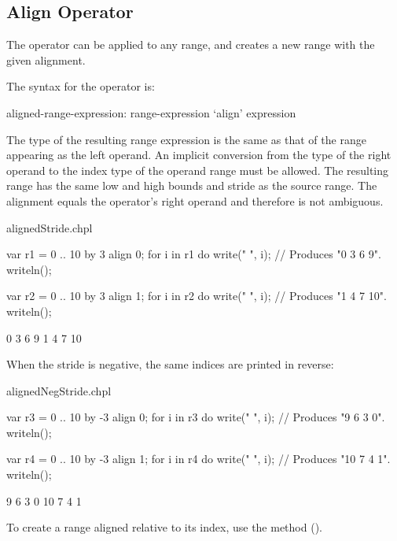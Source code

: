 \subsection{Align Operator}
\label{Align_Operator}

The  operator can be applied to any range, and creates a new range
with the given alignment.  

The syntax for the  operator is:
\begin{syntax}
aligned-range-expression:
  range-expression `align' expression
\end{syntax}
\noindent The type of the resulting range expression is the same as that of the
range appearing as the left operand.  An implicit conversion from
the type of the right operand to the index type of the operand range
must be allowed.
The resulting range has the
same low and high bounds and stride as the source range. The
alignment equals the  operator's right operand
and therefore is not ambiguous. 

\begin{chapelexample}{alignedStride.chpl}
\begin{chapel}
var r1 = 0 .. 10 by 3 align 0;
for i in r1 do
  write(" ", i);			// Produces "0 3 6 9".
writeln();

var r2 = 0 .. 10 by 3 align 1;
for i in r2 do
  write(" ", i);			// Produces "1 4 7 10".
writeln();
\end{chapel}
\begin{chapeloutput}
 0 3 6 9
 1 4 7 10
\end{chapeloutput}
\end{chapelexample}

When the stride is negative, the same indices are printed in reverse:
\begin{chapelexample}{alignedNegStride.chpl}
\begin{chapel}
var r3 = 0 .. 10 by -3 align 0;
for i in r3 do
  write(" ", i);			// Produces "9 6 3 0".
writeln();

var r4 = 0 .. 10 by -3 align 1;
for i in r4 do
  write(" ", i);			// Produces "10 7 4 1".
writeln();
\end{chapel}
\begin{chapeloutput}
 9 6 3 0
 10 7 4 1
\end{chapeloutput}
\end{chapelexample}

To create a range aligned relative to its  index, use
the  method ().


